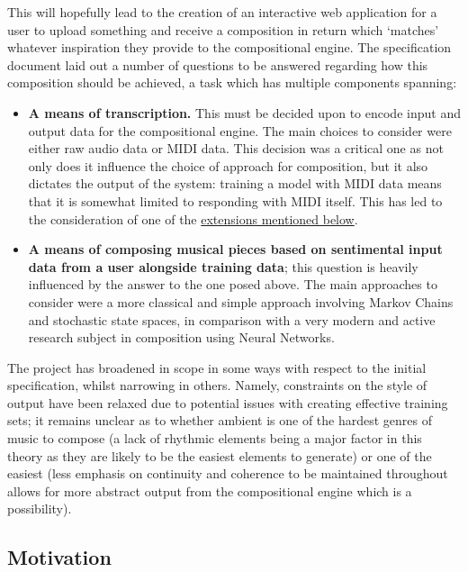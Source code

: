 \documentclass[12pt,]{article}
\providecommand{\tightlist}{%
  \setlength{\itemsep}{0pt}\setlength{\parskip}{0pt}}
\begin{document}
This will hopefully lead to the creation of an interactive web
application for a user to upload something and receive a composition in
return which `matches' whatever inspiration they provide to the
compositional engine. The specification document laid out a number of
questions to be answered regarding how this composition should be
achieved, a task which has multiple components spanning:

\begin{itemize}
\tightlist
\item
  \textbf{A means of transcription.} This must be decided upon to encode
  input and output data for the compositional engine. The main choices
  to consider were either raw audio data or MIDI data. This decision was
  a critical one as not only does it influence the choice of approach
  for composition, but it also dictates the output of the system:
  training a model with MIDI data means that it is somewhat limited to
  responding with MIDI itself. This has led to the consideration of one
  of the \protect\hyperlink{synthesiserparameters}{extensions mentioned
  below}.
\item
  \textbf{A means of composing musical pieces based on sentimental input
  data from a user alongside training data}; this question is heavily
  influenced by the answer to the one posed above. The main approaches
  to consider were a more classical and simple approach involving Markov
  Chains and stochastic state spaces, in comparison with a very modern
  and active research subject in composition using Neural Networks.
\end{itemize}

The project has broadened in scope in some ways with respect to the
initial specification, whilst narrowing in others. Namely, constraints
on the style of output have been relaxed due to potential issues with
creating effective training sets; it remains unclear as to whether
ambient is one of the hardest genres of music to compose (a lack of
rhythmic elements being a major factor in this theory as they are likely
to be the easiest elements to generate) or one of the easiest (less
emphasis on continuity and coherence to be maintained throughout allows
for more abstract output from the compositional engine which is a
possibility).

\hypertarget{motivation}{%
\subsection{Motivation}\label{motivation}}
\end{document}
